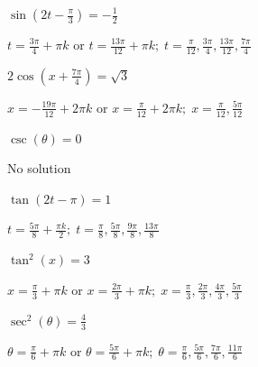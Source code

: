 \documentclass{ximera}
\begin{document}
\begin{question}
\begin{problem}
$\sin \left( 2t - \frac{\pi}{3} \right) = -\frac{1}{2}$

\begin{solution}
$t = \frac{3\pi}{4} + \pi k$ or $t = \frac{13\pi}{12} + \pi k; \; t = \frac{\pi}{12}, \frac{3\pi}{4}, \frac{13\pi}{12}, \frac{7\pi}{4}$
\end{solution}
\end{problem}

\begin{problem}
$2\cos \left( x + \frac{7\pi}{4} \right) = \sqrt{3}$

\begin{solution}
$x = -\frac{19\pi}{12} + 2\pi k$ or $x = \frac{\pi}{12} + 2\pi k; \; x = \frac{\pi}{12}, \frac{5\pi}{12}$
\end{solution}
\end{problem}

\begin{problem}
$\csc( \theta) = 0$

\begin{solution}
No solution
\end{solution}
\end{problem}

\begin{problem}
$\tan \left( 2t - \pi \right) = 1$

\begin{solution}
$t = \frac{5\pi}{8} + \frac{\pi k}{2}; \; t = \frac{\pi}{8}, \frac{5\pi}{8}, \frac{9\pi}{8}, \frac{13\pi}{8}$
\end{solution}
\end{problem}

\begin{problem}
$\tan^{2} \left( x \right) = 3$

\begin{solution}
$x = \frac{\pi}{3} + \pi k$ or $x = \frac{2\pi}{3} + \pi k; \; x = \frac{\pi}{3}, \frac{2\pi}{3}, \frac{4\pi}{3}, \frac{5\pi}{3}$
\end{solution}
\end{problem}

\begin{problem}
$\sec^{2} \left( \theta \right) = \frac{4}{3}$

\begin{solution}
$\theta  = \frac{\pi}{6} + \pi k$ or $\theta = \frac{5\pi}{6} + \pi k; \; \theta = \frac{\pi}{6}, \frac{5\pi}{6}, \frac{7\pi}{6}, \frac{11\pi}{6}$
\end{solution}
\end{problem}


\end{question}
\end{document}
